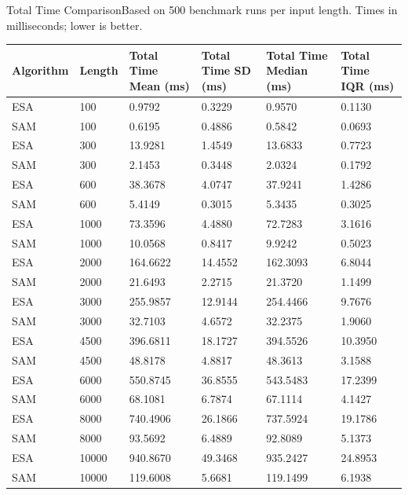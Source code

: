 \begin{benchmarktable}{Total Time Comparison}{Based on 500 benchmark runs per input length. Times in milliseconds; lower is better.}
\begin{tabularx}{\textwidth}{|X|X|X|X|X|X|}
\toprule
Algorithm & Length & Total Time Mean (ms) & Total Time SD (ms) & Total Time Median (ms) & Total Time IQR (ms) \\
\midrule
ESA & 100 & 0.9792 & 0.3229 & 0.9570 & 0.1130 \\
SAM & 100 & 0.6195 & 0.4886 & 0.5842 & 0.0693 \\
\hline
ESA & 300 & 13.9281 & 1.4549 & 13.6833 & 0.7723 \\
SAM & 300 & 2.1453 & 0.3448 & 2.0324 & 0.1792 \\
\hline
ESA & 600 & 38.3678 & 4.0747 & 37.9241 & 1.4286 \\
SAM & 600 & 5.4149 & 0.3015 & 5.3435 & 0.3025 \\
\hline
ESA & 1000 & 73.3596 & 4.4880 & 72.7283 & 3.1616 \\
SAM & 1000 & 10.0568 & 0.8417 & 9.9242 & 0.5023 \\
\hline
ESA & 2000 & 164.6622 & 14.4552 & 162.3093 & 6.8044 \\
SAM & 2000 & 21.6493 & 2.2715 & 21.3720 & 1.1499 \\
\hline
ESA & 3000 & 255.9857 & 12.9144 & 254.4466 & 9.7676 \\
SAM & 3000 & 32.7103 & 4.6572 & 32.2375 & 1.9060 \\
\hline
ESA & 4500 & 396.6811 & 18.1727 & 394.5526 & 10.3950 \\
SAM & 4500 & 48.8178 & 4.8817 & 48.3613 & 3.1588 \\
\hline
ESA & 6000 & 550.8745 & 36.8555 & 543.5483 & 17.2399 \\
SAM & 6000 & 68.1081 & 6.7874 & 67.1114 & 4.1427 \\
\hline
ESA & 8000 & 740.4906 & 26.1866 & 737.5924 & 19.1786 \\
SAM & 8000 & 93.5692 & 6.4889 & 92.8089 & 5.1373 \\
\hline
ESA & 10000 & 940.8670 & 49.3468 & 935.2427 & 24.8953 \\
SAM & 10000 & 119.6008 & 5.6681 & 119.1499 & 6.1938 \\
\bottomrule
\end{tabularx}
\end{benchmarktable}


